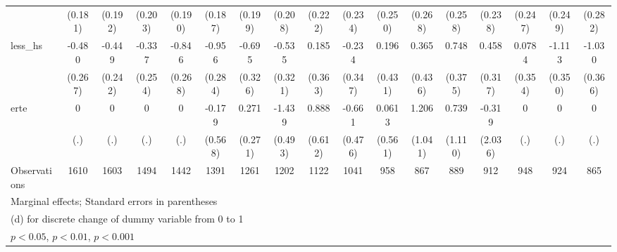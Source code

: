 {\begin{tabular}{l*{16}{c}}
                    &     (0.181)         &     (0.192)         &     (0.203)         &     (0.190)         &     (0.187)         &     (0.199)         &     (0.208)         &     (0.222)         &     (0.234)         &     (0.250)         &     (0.268)         &     (0.258)         &     (0.238)         &     (0.247)         &     (0.249)         &     (0.282)         \\
[1em]
less\_hs             &      -0.480         &      -0.449         &      -0.337         &      -0.846\sym{**} &      -0.956\sym{***}&      -0.695\sym{*}  &      -0.535         &       0.185         &      -0.234         &       0.196         &       0.365         &       0.748\sym{*}  &       0.458         &      0.0784         &      -1.113\sym{**} &      -1.030\sym{**} \\
                    &     (0.267)         &     (0.242)         &     (0.254)         &     (0.268)         &     (0.284)         &     (0.326)         &     (0.321)         &     (0.363)         &     (0.347)         &     (0.431)         &     (0.436)         &     (0.375)         &     (0.317)         &     (0.354)         &     (0.350)         &     (0.366)         \\
[1em]
erte                &           0         &           0         &           0         &           0         &      -0.179         &       0.271         &      -1.439\sym{**} &       0.888         &      -0.661         &      0.0613         &       1.206         &       0.739         &      -0.319         &           0         &           0         &           0         \\
                    &         (.)         &         (.)         &         (.)         &         (.)         &     (0.568)         &     (0.271)         &     (0.493)         &     (0.612)         &     (0.476)         &     (0.561)         &     (1.041)         &     (1.110)         &     (2.036)         &         (.)         &         (.)         &         (.)         \\
\hline
Observations        &        1610         &        1603         &        1494         &        1442         &        1391         &        1261         &        1202         &        1122         &        1041         &         958         &         867         &         889         &         912         &         948         &         924         &         865         \\
\hline\hline
\multicolumn{17}{l}{\footnotesize Marginal effects; Standard errors in parentheses}\\
\multicolumn{17}{l}{\footnotesize  (d) for discrete change of dummy variable from 0 to 1}\\
\multicolumn{17}{l}{\footnotesize \sym{*} \(p<0.05\), \sym{**} \(p<0.01\), \sym{***} \(p<0.001\)}\\
\end{tabular}
}
